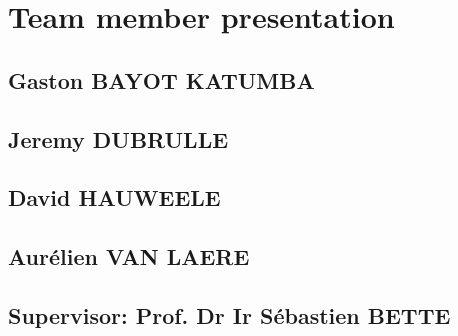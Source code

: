 \documentclass[a4paper,10pt]{article}
\begin{document}
\section{Team member presentation}

\subsection{Gaston BAYOT KATUMBA}

\subsection{Jeremy DUBRULLE}


\subsection{David HAUWEELE}


\subsection{Aurélien VAN LAERE}

\subsection{Supervisor: Prof. Dr Ir Sébastien BETTE}

 
\end{document}
